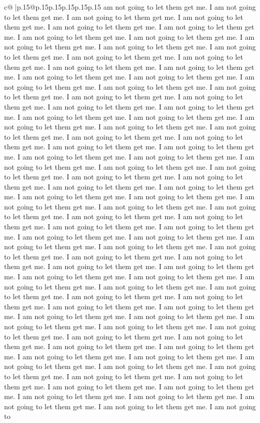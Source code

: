 \documentclass{article}
\begin{document}
{\begin{supertabular}{c@{$\;$}|p{.15\linewidth}@{}p{.15\linewidth}p{.15\linewidth}p{.15\linewidth}p{.15\linewidth}p{.15\linewidth}}
{{{am not going to let them get me. I am not going to let them get me. I am not going to let them get me. I am not going to let them get me. I am not going to let them get me. I am not going to let them get me. I am not going to let them get me. I am not going to let them get me. I am not going to let them get me. I am not going to let them get me. I am not going to let them get me. I am not going to let them get me. I am not going to let them get me. I am not going to let them get me. I am not going to let them get me. I am not going to let them get me. I am not going to let them get me. I am not going to let them get me. I am not going to let them get me. I am not going to let them get me. I am not going to let them get me. I am not going to let them get me. I am not going to let them get me. I am not going to let them get me. I am not going to let them get me. I am not going to let them get me. I am not going to let them get me. I am not going to let them get me. I am not going to let them get me. I am not going to let them get me. I am not going to let them get me. I am not going to let them get me. I am not going to let them get me. I am not going to let them get me. I am not going to let them get me. I am not going to let them get me. I am not going to let them get me. I am not going to let them get me. I am not going to let them get me. I am not going to let them get me. I am not going to let them get me. I am not going to let them get me. I am not going to let them get me. I am not going to let them get me. I am not going to let them get me. I am not going to let them get me. I am not going to let them get me. I am not going to let them get me. I am not going to let them get me. I am not going to let them get me. I am not going to let them get me. I am not going to let them get me. I am not going to let them get me. I am not going to let them get me. I am not going to let them get me. I am not going to let them get me. I am not going to let them get me. I am not going to let them get me. I am not going to let them get me. I am not going to let them get me. I am not going to let them get me. I am not going to let them get me. I am not going to let them get me. I am not going to let them get me. I am not going to let them get me. I am not going to let them get me. I am not going to let them get me. I am not going to let them get me. I am not going to let them get me. I am not going to let them get me. I am not going to let them get me. I am not going to let them get me. I am not going to let them get me. I am not going to let them get me. I am not going to let them get me. I am not going to let them get me. I am not going to let them get me. I am not going to let them get me. I am not going to let them get me. I am not going to let them get me. I am not going to let them get me. I am not going to let them get me. I am not going to let them get me. I am not going to let them get me. I am not going to let them get me. I am not going to let them get me. I am not going to let them get me. I am not going to let them get me. I am not going to let them get me. I am not going to let them get me. I am not going to let them get me. I am not going to }}}
\end{supertabular}}
\end{document}
